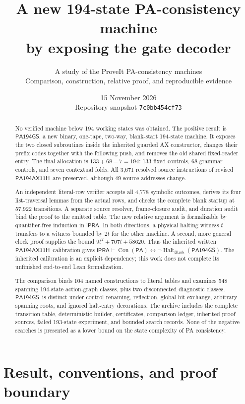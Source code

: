 \documentclass[10pt,a4paper]{article}
\title{A new 194-state PA-consistency machine\\by exposing the gate decoder}
\author{A study of the ProveIt PA-consistency machines\\
\small Comparison, construction, relative proof, and reproducible evidence}
\date{15 November 2026\\\small Repository snapshot \texttt{7c0bb454cf73}}
\newcommand{\iPRA}{\ensuremath{\mathsf{iPRA}}}
\newcommand{\PA}{\ensuremath{\mathsf{PA}}}
\newcommand{\Con}{\operatorname{Con}}
\newcommand{\Halt}{\operatorname{Halt}}
\newcommand{\Blank}{\mathsf{Blank}}
\newcommand{\GS}{\ensuremath{\mathsf{PA194GS}}}
\newcommand{\Parent}{\ensuremath{\mathsf{PA194AX11H}}}
\theoremstyle{definition}
\begin{document}
\maketitle

\begin{abstract}
No verified machine below 194 working states was obtained. The positive
result is \GS, a new binary, one-tape, two-way, blank-start 194-state machine.
It exposes the two closed subroutines inside the inherited guarded AX
constructor, changes their prefix codes together with the following push,
and removes the old shared fixed-reader entry. The final allocation is
$133+68-7=194$: 133 fixed controls, 68 grammar controls, and seven contextual
folds. All 3,671 resolved source instructions of revised \Parent\ are
preserved, although 49 source addresses change.

An independent literal-row verifier accepts all 4,778 symbolic outcomes,
derives its four list-traversal lemmas from the actual rows, and checks the
complete blank startup at 57,922 transitions. A separate source resolver,
frame-closure audit, and duration audit bind the proof to the emitted table.
The new relative argument is formalizable by quantifier-free induction in
\iPRA. In both directions, a physical halting witness $t$ transfers to a
witness bounded by $2t$ for the other machine. A second, more general
clock proof supplies the bound $9t^2+707t+58620$. Thus the inherited
written \Parent\ calibration gives
$\iPRA\vdash\Con(\PA)\leftrightarrow\neg\Halt_{\Blank}(\GS)$.
The inherited calibration is an explicit dependency; this work does not
complete its unfinished end-to-end Lean formalization.

The comparison binds 104 named constructions to literal tables and examines
548 spanning 194-state action-graph classes, plus two disconnected diagnostic
classes. \GS\ is distinct under control renaming, reflection, global bit
exchange, arbitrary spanning roots, and ignored halt-entry decorations.
The archive includes the complete transition table, deterministic builder,
certificates, comparison ledger, inherited proof sources, failed 193-state
experiment, and bounded search records. None of the negative searches is
presented as a lower bound on the state complexity of PA consistency.
\end{abstract}

\clearpage
\tableofcontents
\clearpage

\section{Result, conventions, and proof boundary}
\label{sec:result}
\end{document}
